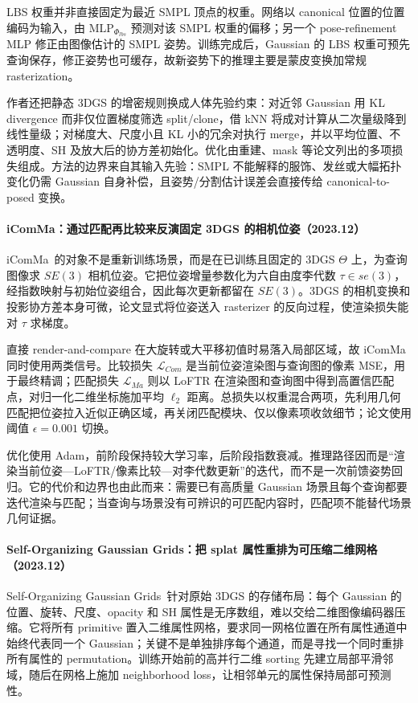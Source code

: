 LBS 权重并非直接固定为最近 SMPL 顶点的权重。网络以 canonical 位置的位置编码为输入，由 $\mathrm{MLP}_{\Phi_{lbs}}$ 预测对该 SMPL 权重的偏移；另一个 pose-refinement MLP 修正由图像估计的 SMPL 姿势。训练完成后，Gaussian 的 LBS 权重可预先查询保存，修正姿势也可缓存，故新姿势下的推理主要是蒙皮变换加常规 rasterization。

作者还把静态 3DGS 的增密规则换成人体先验约束：对近邻 Gaussian 用 KL divergence 而非仅位置梯度筛选 split/clone，借 kNN 将成对计算从二次量级降到线性量级；对梯度大、尺度小且 KL 小的冗余对执行 merge，并以平均位置、不透明度、SH 及放大后的协方差初始化。优化由重建、mask 等论文列出的多项损失组成。方法的边界来自其输入先验：SMPL 不能解释的服饰、发丝或大幅拓扑变化仍需 Gaussian 自身补偿，且姿势/分割估计误差会直接传给 canonical-to-posed 变换。


\paragraph{iComMa：通过匹配再比较来反演固定 3DGS 的相机位姿（2023.12）}
iComMa~\cite{2312_09031}的对象不是重新训练场景，而是在已训练且固定的 3DGS $\Theta$ 上，为查询图像求 $SE(3)$ 相机位姿。它把位姿增量参数化为六自由度李代数 $\tau\in se(3)$，经指数映射与初始位姿组合，因此每次更新都留在 $SE(3)$。3DGS 的相机变换和投影协方差本身可微，论文显式将位姿送入 rasterizer 的反向过程，使渲染损失能对 $\tau$ 求梯度。

直接 render-and-compare 在大旋转或大平移初值时易落入局部区域，故 iComMa 同时使用两类信号。比较损失 $\mathcal L_{Com}$ 是当前位姿渲染图与查询图的像素 MSE，用于最终精调；匹配损失 $\mathcal L_{Ma}$ 则以 LoFTR 在渲染图和查询图中得到高置信匹配点，对归一化二维坐标施加平均 $\ell_2$ 距离。总损失以权重混合两项，先利用几何匹配把位姿拉入近似正确区域，再关闭匹配模块、仅以像素项收敛细节；论文使用阈值 $\epsilon=0.001$ 切换。

优化使用 Adam，前阶段保持较大学习率，后阶段指数衰减。推理路径因而是“渲染当前位姿—LoFTR/像素比较—对李代数更新”的迭代，而不是一次前馈姿势回归。它的代价和边界也由此而来：需要已有高质量 Gaussian 场景且每个查询都要迭代渲染与匹配；当查询与场景没有可辨识的可匹配内容时，匹配项不能替代场景几何证据。


\paragraph{Self-Organizing Gaussian Grids：把 splat 属性重排为可压缩二维网格（2023.12）}
Self-Organizing Gaussian Grids~\cite{2312_13299}针对原始 3DGS 的存储布局：每个 Gaussian 的位置、旋转、尺度、opacity 和 SH 属性是无序数组，难以交给二维图像编码器压缩。它将所有 primitive 置入二维属性网格，要求同一网格位置在所有属性通道中始终代表同一个 Gaussian；关键不是单独排序每个通道，而是寻找一个同时重排所有属性的 permutation。训练开始前的高并行二维 sorting 先建立局部平滑邻域，随后在网格上施加 neighborhood loss，让相邻单元的属性保持局部可预测性。

